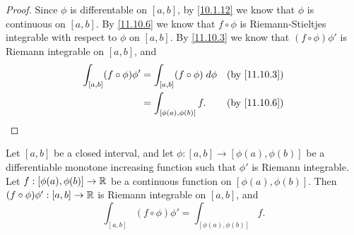 \begin{proof}
  Since \(\phi\) is differentable on \([a, b]\), by \cref{10.1.12} we know that \(\phi\) is continuous on \([a, b]\).
  By \cref{11.10.6} we know that \(f \circ \phi\) is Riemann-Stieltjes integrable with respect to \(\phi\) on \([a, b]\).
  By \cref{11.10.3} we know that \((f \circ \phi) \phi'\) is Riemann integrable on \([a, b]\), and
  \begin{align*}
    \int_{[a, b]} (f \circ \phi) \phi' & = \int_{[a, b]} (f \circ \phi) \; d \phi &  & \by{11.10.3} \\
                                       & = \int_{[\phi(a), \phi(b)]} f.           &  & \by{11.10.6}
  \end{align*}
\end{proof}

\begin{ac}\label{ac:11.10.1}
  Let \([a, b]\) be a closed interval, and let \(\phi : [a, b] \to [\phi(a), \phi(b)]\) be a differentiable monotone increasing function such that \(\phi'\) is Riemann integrable.
  Let \(f : [\phi(a), \phi(b)] \to \mathbb{R}\) be a continuous function on \([\phi(a), \phi(b)]\).
  Then \((f \circ \phi) \phi' : [a, b] \to \mathbb{R}\) is Riemann integrable on \([a, b]\), and
  \[
    \int_{[a, b]} (f \circ \phi) \phi' = \int_{[\phi(a), \phi(b)]} f.
  \]
\end{ac}

